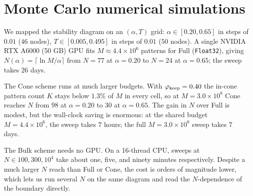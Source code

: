 \documentclass[letterpaper]{article} %
\newcommand{\Bnet}{\beta}
\begin{document}

\section{Monte Carlo numerical simulations}
\label{sec:results}

We mapped the stability diagram %
on an $(\alpha, T)$ grid: $\alpha \in [0.20, 0.65]$ in steps of $0.01$ ($46$ nodes), $T \in [0.005, 0.495]$ in steps of $0.01$ ($50$ nodes). A single NVIDIA RTX A6000 (50 GB) GPU fits $M \approx 4.4 \times 10^6$ patterns for Full (\texttt{Float32}), giving $N(\alpha) = \lceil \ln M / \alpha \rceil$ from $N = 77$ at $\alpha = 0.20$ to $N = 24$ at $\alpha = 0.65$; the sweep takes $26$ days.

The Cone scheme runs at much larger budgets. With $\varphi_{\rm keep} = 0.40$ the in-cone pattern count $K$ stays below $1.3\%$ of $M$ in every cell, so at $M = 3.0 \times 10^8$ Cone reaches $N$ from $98$ at $\alpha = 0.20$ to $30$ at $\alpha = 0.65$. The gain in $N$ over Full is modest, but the wall-clock saving is enormous: at the shared budget $M = 4.4 \times 10^6$, the sweep takes $7$ hours; the full $M = 3.0 \times 10^8$ sweep takes $7$ days.

The Bulk scheme needs no GPU. On a 16-thread CPU, sweeps at $N \in {100, 300, 10^4}$ take about one, five, and ninety minutes respectively. Despite a much larger $N$ reach than Full or Cone, the cost is orders of magnitude lower, which lets us run several $N$ on the same diagram and read the $N$-dependence of the boundary directly. 

\end{document}
